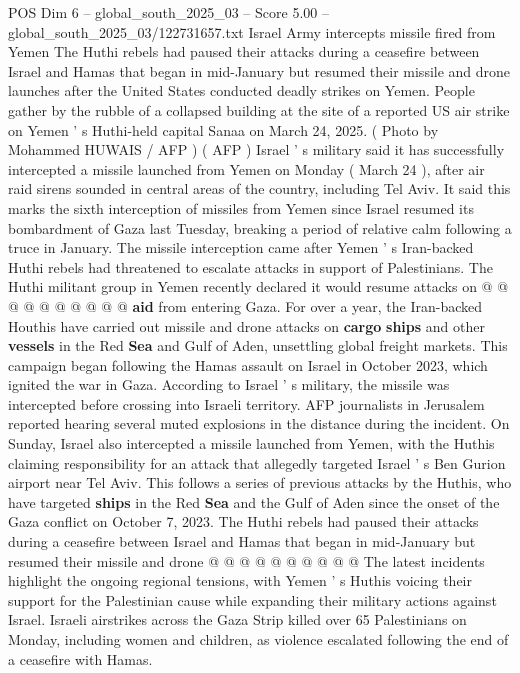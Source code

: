 \begin{textsample}{POS Dim 6 – global\_south\_2025\_03 – Score 5.00 – global\_south\_2025\_03/122731657.txt}  \label{ex:f6_pos_225}
Israel Army intercepts missile fired from Yemen The Huthi rebels had paused their attacks during a ceasefire between Israel and Hamas that began in mid-January but resumed their missile and drone launches after the United States conducted deadly strikes on Yemen.
People gather by the rubble of a collapsed building at the site of a reported US air strike on Yemen ' s Huthi-held capital Sanaa on March 24, 2025. ( Photo by Mohammed HUWAIS / AFP ) ( AFP ) Israel ' s military said it has successfully intercepted a missile launched from Yemen on Monday ( March 24 ), after air raid sirens sounded in central areas of the country, including Tel Aviv.
It said this marks the sixth interception of missiles from Yemen since Israel resumed its bombardment of Gaza last Tuesday, breaking a period of relative calm following a truce in January.
The missile interception came after Yemen ' s Iran-backed Huthi rebels had threatened to escalate attacks in support of Palestinians.
The Huthi militant group in Yemen recently declared it would resume attacks on @ @ @ @ @ @ @ @ @ @ \textbf{aid} from entering Gaza.
For over a year, the Iran-backed Houthis have carried out missile and drone attacks on \textbf{cargo} \textbf{ships} and other \textbf{vessels} in the Red \textbf{Sea} and Gulf of Aden, unsettling global freight markets.
This campaign began following the Hamas assault on Israel in October 2023, which ignited the war in Gaza.
According to Israel ' s military, the missile was intercepted before crossing into Israeli territory.
AFP journalists in Jerusalem reported hearing several muted explosions in the distance during the incident.
On Sunday, Israel also intercepted a missile launched from Yemen, with the Huthis claiming responsibility for an attack that allegedly targeted Israel ' s Ben Gurion airport near Tel Aviv.
This follows a series of previous attacks by the Huthis, who have targeted \textbf{ships} in the Red \textbf{Sea} and the Gulf of Aden since the onset of the Gaza conflict on October 7, 2023.
The Huthi rebels had paused their attacks during a ceasefire between Israel and Hamas that began in mid-January but resumed their missile and drone @ @ @ @ @ @ @ @ @ @ The latest incidents highlight the ongoing regional tensions, with Yemen ' s Huthis voicing their support for the Palestinian cause while expanding their military actions against Israel.
Israeli airstrikes across the Gaza Strip killed over 65 Palestinians on Monday, including women and children, as violence escalated following the end of a ceasefire with Hamas.

\end{textsample}
